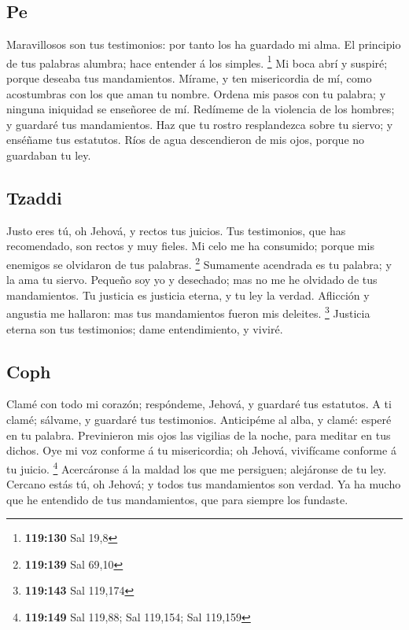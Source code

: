 \hypertarget{pe}{%
\subsection{Pe}\label{pe}}

 Maravillosos son tus testimonios: por tanto los ha
guardado mi alma.  El principio de tus palabras alumbra;
hace entender á los simples. \footnote{\textbf{119:130} Sal 19,8}
 Mi boca abrí y suspiré; porque deseaba tus mandamientos.
 Mírame, y ten misericordia de mí, como acostumbras con
los que aman tu nombre.  Ordena mis pasos con tu palabra;
y ninguna iniquidad se enseñoree de mí.  Redímeme de la
violencia de los hombres; y guardaré tus mandamientos. 
Haz que tu rostro resplandezca sobre tu siervo; y enséñame tus
estatutos.  Ríos de agua descendieron de mis ojos, porque
no guardaban tu ley.

\hypertarget{tzaddi}{%
\subsection{Tzaddi}\label{tzaddi}}

 Justo eres tú, oh Jehová, y rectos tus juicios.
 Tus testimonios, que has recomendado, son rectos y muy
fieles.  Mi celo me ha consumido; porque mis enemigos se
olvidaron de tus palabras. \footnote{\textbf{119:139} Sal 69,10}
 Sumamente acendrada es tu palabra; y la ama tu siervo.
 Pequeño soy yo y desechado; mas no me he olvidado de tus
mandamientos.  Tu justicia es justicia eterna, y tu ley la
verdad.  Aflicción y angustia me hallaron: mas tus
mandamientos fueron mis deleites. \footnote{\textbf{119:143} Sal 119,174}
 Justicia eterna son tus testimonios; dame entendimiento,
y viviré.

\hypertarget{coph}{%
\subsection{Coph}\label{coph}}

 Clamé con todo mi corazón; respóndeme, Jehová, y guardaré
tus estatutos.  A ti clamé; sálvame, y guardaré tus
testimonios.  Anticipéme al alba, y clamé: esperé en tu
palabra.  Previnieron mis ojos las vigilias de la noche,
para meditar en tus dichos.  Oye mi voz conforme á tu
misericordia; oh Jehová, vivifícame conforme á tu juicio. \footnote{\textbf{119:149}
  Sal 119,88; Sal 119,154; Sal 119,159}  Acercáronse á la
maldad los que me persiguen; alejáronse de tu ley. 
Cercano estás tú, oh Jehová; y todos tus mandamientos son verdad.
 Ya ha mucho que he entendido de tus mandamientos, que
para siempre los fundaste.

